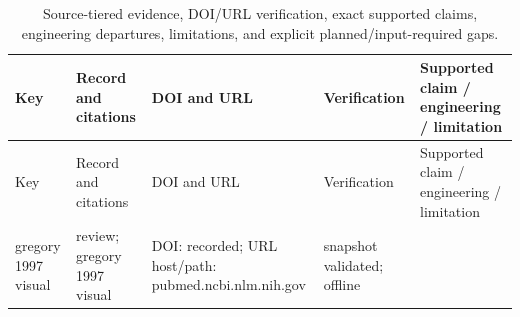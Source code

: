 \documentclass[
  english,
]{article}
\begin{document}
\begin{longtable}[]{@{}
  >{\raggedright\arraybackslash}p{}
  >{\raggedright\arraybackslash}p{}
  >{\raggedright\arraybackslash}p{}
  >{\raggedright\arraybackslash}p{}
  >{\raggedright\arraybackslash}p{}@{}}
\caption{Source-tiered evidence, DOI/URL verification, exact supported
claims, engineering departures, limitations, and explicit
planned/input-required gaps.}\label{tbl:evidence_audit}\tabularnewline
\toprule\noalign{}
\begin{minipage}[b]{\linewidth}\raggedright
Key
\end{minipage} & \begin{minipage}[b]{\linewidth}\raggedright
Record and citations
\end{minipage} & \begin{minipage}[b]{\linewidth}\raggedright
DOI and URL
\end{minipage} & \begin{minipage}[b]{\linewidth}\raggedright
Verification
\end{minipage} & \begin{minipage}[b]{\linewidth}\raggedright
Supported claim / engineering / limitation
\end{minipage} \\
\midrule\noalign{}
\endfirsthead
\toprule\noalign{}
\begin{minipage}[b]{\linewidth}\raggedright
Key
\end{minipage} & \begin{minipage}[b]{\linewidth}\raggedright
Record and citations
\end{minipage} & \begin{minipage}[b]{\linewidth}\raggedright
DOI and URL
\end{minipage} & \begin{minipage}[b]{\linewidth}\raggedright
Verification
\end{minipage} & \begin{minipage}[b]{\linewidth}\raggedright
Supported claim / engineering / limitation
\end{minipage} \\
\midrule\noalign{}
\endhead
\bottomrule\noalign{}
\endlastfoot
gregory 1997 visual & review; gregory 1997 visual & DOI: recorded; URL
host/path: pubmed.ncbi.nlm.nih.gov & snapshot validated; offline

\end{longtable}
\end{document}
